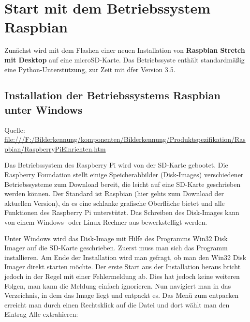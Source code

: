 %
%
%






\section{Start mit dem Betriebssystem Raspbian}

Zunächst wird mit dem Flashen  einer neuen Installation von 
\textbf{Raspbian Stretch mit Desktop} auf eine microSD-Karte. 
Das Betriebssyste enthält standardmäßig eine Python-Unterstützung, zur Zeit mit dfer Version 3.5. 


\subsection{Installation der Betriebssystems Raspbian unter Windows}

{\tiny Quelle: \url{file:///F:/Bilderkennung/komponenten/Bilderkennung/Produktspezifikation/Raspbian/RaspberryPiEinrichten.htm}}



Das Betriebssystem des Raspberry Pi wird von der SD-Karte gebootet. Die Raspberry Foundation stellt einige Speicherabbilder (Disk-Images) verschiedener Betriebssysteme zum Download bereit, die leicht auf eine SD-Karte geschrieben werden können. Der Standard ist Raspbian (hier gehts zum Download der aktuellen Version), da es eine schlanke grafische Oberfläche bietet und alle Funktionen des Raspberry Pi unterstützt. Das Schreiben des Disk-Images kann von einem Windows- oder Linux-Rechner aus bewerkstelligt werden.


\bigskip

Unter Windows wird das Disk-Image mit Hilfe des Programms Win32 Disk Imager auf die SD-Karte geschrieben. \cite{Win32DiskImage:2020} Zuerst muss man sich das Programm installieren. Am Ende der Installation wird man gefragt, ob man den Win32 Disk Imager direkt starten möchte. Der erste Start aus der Installation heraus bricht jedoch in der Regel mit einer Fehlermeldung ab. Dies hat jedoch keine weiteren Folgen, man kann die Meldung einfach ignorieren.
Nun navigiert man in das Verzeichnis, in dem das Image liegt und entpackt es. Das Menü zum entpacken erreicht man durch einen Rechtsklick auf die Datei und dort wählt man den Eintrag \textsf{Alle extrahieren}:

